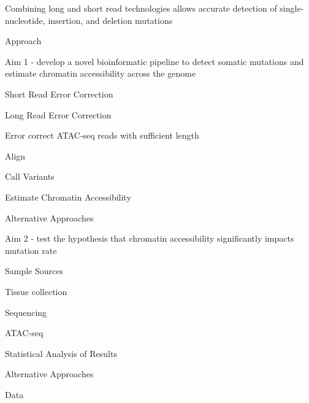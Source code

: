\begin{outline}
\begin{outline}
		\item Combining long and short read technologies allows accurate detection of single-nucleotide, insertion, and deletion mutations
	\end{outline}
	\item Approach
	\begin{outline}
		\item Aim 1 - develop a novel bioinformatic pipeline to detect somatic mutations and estimate chromatin accessibility across the genome
			\begin{outline}
				\item Short Read Error Correction
				\item Long Read Error Correction
				\item Error correct ATAC-seq reads with sufficient length
				\item Align
				\item Call Variants
				\item Estimate Chromatin Accessibility
				\item Alternative Approaches
			\end{outline}
		\item Aim 2 - test the hypothesis that chromatin accessibility significantly impacts mutation rate
			\begin{outline}
				\item Sample Sources
				\item Tissue collection
				\item Sequencing
				\item ATAC-seq
				\item Statistical Analysis of Results
				\item Alternative Approaches
				\item Data
			\end{outline}
	\end{outline}
\end{outline}
\medskip

\printbibliography














